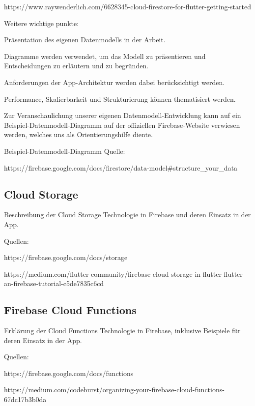 https://www.raywenderlich.com/6628345-cloud-firestore-for-flutter-getting-started

Weitere wichtige punkte:

\begin{compactitem}
    \item Präsentation des eigenen Datenmodells in der Arbeit.
    \item Diagramme werden verwendet, um das Modell zu präsentieren und Entscheidungen zu erläutern und zu begründen.
    \item Anforderungen der App-Architektur werden dabei berücksichtigt werden.
    \item Performance, Skalierbarkeit und Strukturierung können thematisiert werden.
    \item Zur Veranschaulichung unserer eigenen Datenmodell-Entwicklung kann auf ein Beispiel-Datenmodell-Diagramm auf der offiziellen Firebase-Website verwiesen werden, welches uns als Orientierungshilfe diente.
\end{compactitem}

Beispiel-Datenmodell-Diagramm Quelle:

https://firebase.google.com/docs/firestore/data-model\#structure\_your\_data

\subsection{Cloud Storage}

Beschreibung der Cloud Storage Technologie in Firebase und deren Einsatz in der App.

Quellen:

https://firebase.google.com/docs/storage

https://medium.com/flutter-community/firebase-cloud-storage-in-flutter-flutter-an-firebase-tutorial-c5de7835c6cd

\subsection{Firebase Cloud Functions}
\author{Martin Hausleitner}


Erklärung der Cloud Functions Technologie in Firebase, inklusive Beispiele für deren Einsatz in der App.

Quellen:

https://firebase.google.com/docs/functions

https://medium.com/codeburst/organizing-your-firebase-cloud-functions-67dc17b3b0da

